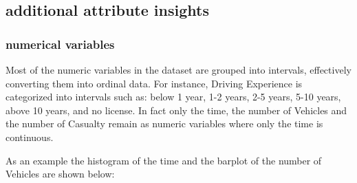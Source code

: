 \documentclass{article}
\begin{document}
\subsection{additional attribute insights}

\subsubsection{numerical variables}

Most of the numeric variables in the dataset are grouped into intervals, effectively converting them into ordinal data. For instance, Driving Experience is categorized into intervals such as: below 1 year, 1-2 years, 2-5 years, 5-10 years, above 10 years, and no license. In fact only the time, the number of Vehicles and the number of Casualty remain as numeric variables where only the time is continuous. \newline

As an example the histogram of the time and the barplot of the number of Vehicles are shown below:
\end{document}
